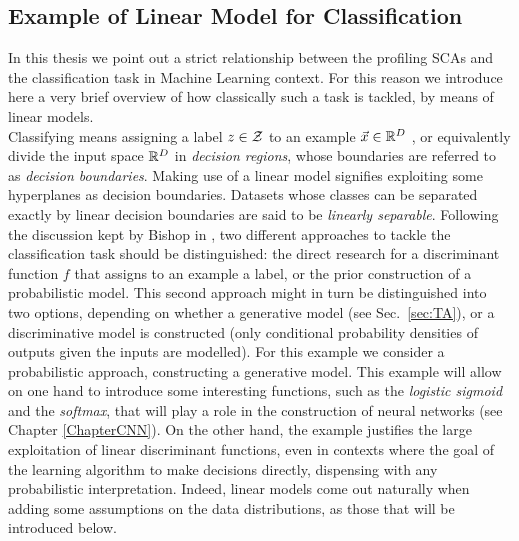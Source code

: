 \subsection{Example of Linear Model for Classification}\label{example:LDA}
In this thesis we point out a strict relationship between the profiling SCAs and the classification task in Machine Learning context. For this reason we introduce here a very brief overview of how classically such a task is tackled, by means of linear models. \\
Classifying means assigning a label $z\in \mathcal{Z}$ to an example $\vec{x}\in\mathbb{R}^D$ , or equivalently divide the input space $\mathbb{R}^D$ in \emph{decision regions}, whose boundaries are referred to as \emph{decision boundaries}. Making use of a linear model signifies exploiting some hyperplanes as decision boundaries. Datasets whose classes can be separated exactly by linear decision boundaries are said to be \emph{linearly separable}. Following the discussion kept by Bishop in \cite{christopher2006pattern}, two different approaches to tackle the classification task should be distinguished: the direct research for a discriminant function $f$ that assigns to an example a label, or the prior construction of a probabilistic model. This second approach might in turn be distinguished into two options, depending on whether a generative model  (see Sec.~\ref{sec:TA}), or a discriminative model is constructed (\ie only conditional probability densities of outputs given the inputs are modelled). For this example we consider a probabilistic approach, constructing a generative model. This example will allow on one hand to introduce some interesting functions, such as the \emph{logistic sigmoid} and the \emph{softmax}, that will play a role in the construction of neural networks (see Chapter \ref{ChapterCNN}). On the other hand, the example justifies the large  exploitation of linear discriminant functions, even in contexts where the goal of the learning algorithm to make decisions directly, dispensing with any probabilistic interpretation. Indeed, linear models come out naturally when adding some assumptions on the data distributions, as those that will be introduced below. \\


